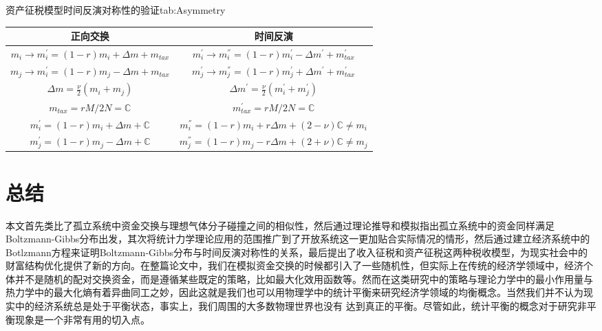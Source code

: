 \documentclass[tsinghuacite]{HustGraduPaper}
\begin{document}
	\begin{generaltab}{资产征税模型时间反演对称性的验证}{tab:Asymmetry}
		\begin{tabularx}{\textwidth}{CC}
			\toprule
			正向交换&时间反演\\
			\midrule
			$m_i \rightarrow m_i^{'} = (1-r) m_i +  \Delta m + m_{tax}$ & $m_i^{'} \rightarrow m_i^{''} = (1-r) m_i^{'} - \Delta m^{'} + m_{tax}^{'}$\\
			$m_j \rightarrow m_i^{'} = (1-r) m_j - \Delta m + m_{tax}$ & $m_j^{'} \rightarrow m_j^{''} = (1-r) m_j^{'} + \Delta m^{'} + m_{tax}^{'}$\\
			$\Delta m = \frac{\nu}{2} (m_i + m_j) $ & $\Delta m^{'} = \frac{\nu}{2} (m_i^{'} + m_j^{'}) $  \\
			$m_{tax} = r M / 2N = \mathbb{C} $ & $m_{tax}^{'} = r M / 2N = \mathbb{C} $ \\
			\midrule
			$m_i^{'} = (1-r) m_i + \Delta m + \mathbb{C} $ & $m_i^{''} =  (1-r) m_i + r \Delta m + (2 - \nu)  \mathbb{C} \neq m_i$ \\
			$m_j^{'} = (1-r) m_j - \Delta m + \mathbb{C}$ & $m_j^{''} = (1-r) m_j - r \Delta m + (2 + \nu) \mathbb{C} \neq m_j$ \\
			\bottomrule
		\end{tabularx}
	\end{generaltab}
	
	
	
	\newpage

	\section{总结}

	本文首先类比了孤立系统中资金交换与理想气体分子碰撞之间的相似性，然后通过理论推导和模拟指出孤立系统中的资金同样满足Boltzmann-Gibbs分布出发，其次将统计力学理论应用的范围推广到了开放系统这一更加贴合实际情况的情形，然后通过建立经济系统中的Botlzmann方程来证明Boltzmann-Gibbs分布与时间反演对称性的关系，最后提出了收入征税和资产征税这两种税收模型，为现实社会中的财富结构优化提供了新的方向。在整篇论文中，我们在模拟资金交换的时候都引入了一些随机性，但实际上在传统的经济学领域中，经济个体并不是随机的配对交换资金，而是遵循某些既定的策略，比如最大化效用函数等\cite{Simon1999}。然而在这类研究中的策略与理论力学中的最小作用量与热力学中的最大化熵有着异曲同工之妙，因此这就是我们也可以用物理学中的统计平衡来研究经济学领域的均衡概念。当然我们并不认为现实中的经济系统总是处于平衡状态，事实上，我们周围的大多数物理世界也没有 达到真正的平衡。尽管如此，统计平衡的概念对于研究非平衡现象是一个非常有用的切入点。
\end{document}
